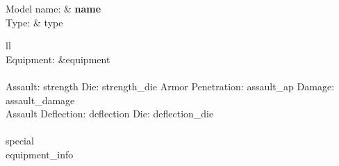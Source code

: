 \begin{tabular}
Model name: & {{\bf {name} }} \\
Type: & {type} \\
\end{tabular}{ll}
\ \\
Equipment: &{equipment} \\
\ \\
Assault: {strength} Die: {strength_die} Armor Penetration: {assault_ap} Damage: {assault_damage} \\
Assault Deflection: {deflection} Die: {deflection_die}\\
\ \\
{special}
\ \\
{equipment_info} 
\ \\


